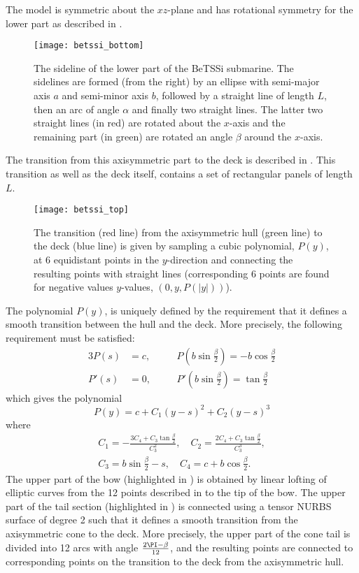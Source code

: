 The model is symmetric about the $xz$-plane and has rotational symmetry for the lower part as described in .
\begin{figure}
	\centering
	\texttt{[image: betssi\_bottom]}
	\caption{The sideline of the lower part of the BeTSSi submarine. The sidelines are formed (from the right) by an ellipse with semi-major axis $a$ and semi-minor axis $b$, followed by a straight line of length $L$, then an arc of angle $\alpha$ and finally two straight lines. The latter two straight lines (in red) are rotated about the $x$-axis and the remaining part (in green) are rotated an angle $\beta$ around the $x$-axis.}
	\label{Fig2:bettsi_bottom}
\end{figure}
The transition from this axisymmetric part to the deck is described in . This transition as well as the deck itself, contains a set of rectangular panels of length $L$.
\begin{figure}
	\centering
	\texttt{[image: betssi\_top]}
	\caption{The transition (red line) from the axisymmetric hull (green line) to the deck (blue line) is given by sampling a cubic polynomial, $P(y)$, at 6 equidistant points in the $y$-direction and connecting the resulting points with straight lines (corresponding 6 points are found for negative values $y$-values, $(0,y,P(|y|))$).}
	\label{Fig2:bettsi_top}
\end{figure}
The polynomial $P(y)$, is uniquely defined by the requirement that it defines a smooth transition between the hull and the deck. More precisely, the following requirement must be satisfied: 
\begin{alignat*}{3}
	P(s) &= c,\quad  &&P\left(b\sin\frac{\beta}{2}\right) = -b\cos\frac{\beta}{2}\\
	P'(s) &= 0,\quad &&P'\left(b\sin\frac{\beta}{2}\right) = \tan\frac{\beta}{2}
\end{alignat*}
which gives the polynomial
\begin{equation}
	P(y) = c+C_1(y-s)^2+C_2(y-s)^3
\end{equation}
where
\begin{align*}
	C_1 = -\frac{3C_4+C_3\tan\frac{\beta}{2}}{C_3^2}, \quad
	C_2 = \frac{2C_4+C_3\tan\frac{\beta}{2}}{C_3^3},\\
	C_3 = b\sin\frac{\beta}{2}-s, \quad
	C_4 = c+b\cos\frac{\beta}{2}.
\end{align*}
The upper part of the bow (highlighted in ) is obtained by linear lofting of elliptic curves from the 12 points described in  to the tip of the bow. The upper part of the tail section (highlighted in ) is connected using a tensor NURBS surface of degree 2 such that it defines a smooth transition from the axisymmetric cone to the deck. More precisely, the upper part of the cone tail is divided into 12 arcs with angle $\frac{2\PI-\beta}{12}$, and the resulting points are connected to corresponding points on the transition to the deck from the axisymmetric hull. 
